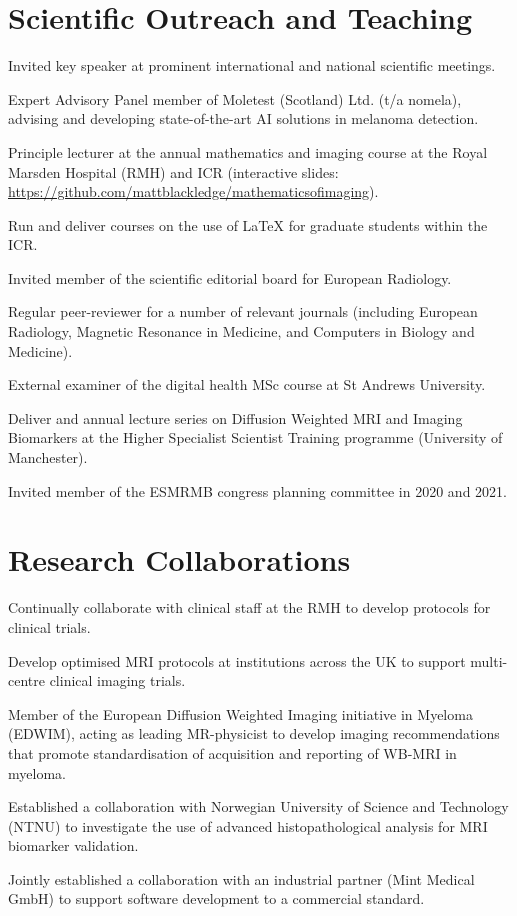 \documentclass[]{mbcv}
\begin{document}
\section{Scientific Outreach and Teaching}
\vspace*{10pt}
\begin{tightemize}
\item Invited key speaker at prominent international and national scientific meetings.
\item Expert Advisory Panel member of Moletest (Scotland) Ltd. (t/a nomela), advising and developing state-of-the-art AI solutions in melanoma detection.
\item Principle lecturer at the annual mathematics and imaging course at the Royal Marsden Hospital (RMH) and ICR (interactive slides: \href{https://github.com/mattblackledge/mathematicsofimaging}{https://github.com/mattblackledge/mathematicsofimaging}).
\item Run and deliver courses on the use of LaTeX for graduate students within the ICR. 
\item Invited member of the scientific editorial board for European Radiology.
\item Regular peer-reviewer for a number of relevant journals (including European Radiology, Magnetic Resonance in Medicine, and Computers in Biology and Medicine).
\item External examiner of the digital health MSc course at St Andrews University.
\item Deliver and annual lecture series on Diffusion Weighted MRI and Imaging Biomarkers at the Higher Specialist Scientist Training programme (University of Manchester).
\item Invited member of the ESMRMB congress planning committee in 2020 and 2021.
\end{tightemize}
\sectionsep


\section{Research Collaborations}
\vspace*{10pt}
\begin{tightemize}
\item Continually collaborate with clinical staff at the RMH to develop protocols for clinical trials.
\item Develop optimised MRI protocols at institutions across the UK to support multi-centre clinical imaging trials.
\item Member of the European Diffusion Weighted Imaging initiative in Myeloma (EDWIM), acting as leading MR-physicist to develop imaging recommendations that promote standardisation of acquisition and reporting of WB-MRI in myeloma.
\item Established a collaboration with Norwegian University of Science and Technology (NTNU) to investigate the use of advanced histopathological analysis for MRI biomarker validation.
\item Jointly established a collaboration with an industrial partner (Mint Medical GmbH) to support software development to a commercial standard.
\end{tightemize}
\end{document}
